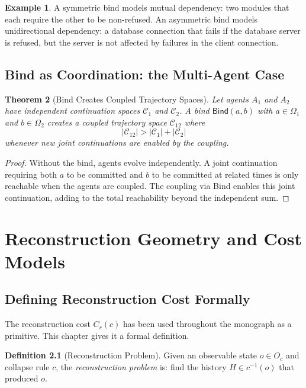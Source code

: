 \documentclass[12pt, a4paper, openany]{book}
\theoremstyle{plain}
\newtheorem{theorem}{Theorem}[chapter]
\theoremstyle{definition}
\newtheorem{definition}[theorem]{Definition}
\newtheorem{example}[theorem]{Example}
\theoremstyle{remark}
\newcommand{\Bind}{\mathsf{Bind}}
\newcommand{\calC}{\mathcal{C}}
\begin{document}
\begin{example}
A symmetric bind models mutual dependency: two modules that each require the
other to be non-refused. An asymmetric bind models unidirectional dependency:
a database connection that fails if the database server is refused, but the
server is not affected by failures in the client connection.
\end{example}

\section{Bind as Coordination: the Multi-Agent Case}

\begin{theorem}[Bind Creates Coupled Trajectory Spaces]
Let agents $A_1$ and $A_2$ have independent continuation spaces $\calC_1$ and
$\calC_2$. A bind $\Bind(a, b)$ with $a \in \Omega_1$ and $b \in \Omega_2$
creates a coupled trajectory space $\calC_{12}$ where
\[
|\calC_{12}| > |\calC_1| + |\calC_2|
\]
whenever new joint continuations are enabled by the coupling.
\end{theorem}

\begin{proof}
Without the bind, agents evolve independently. A joint continuation requiring
both $a$ to be committed and $b$ to be committed at related times is only
reachable when the agents are coupled. The coupling via Bind enables this
joint continuation, adding to the total reachability beyond the independent sum.
\end{proof}

\chapter{Reconstruction Geometry and Cost Models}

\section{Defining Reconstruction Cost Formally}

The reconstruction cost $C_r(c)$ has been used throughout the monograph as
a primitive. This chapter gives it a formal definition.

\begin{definition}[Reconstruction Problem]
Given an observable state $o \in O_c$ and collapse rule $c$, the
\emph{reconstruction problem} is: find the history $H \in c^{-1}(o)$ that
produced $o$.
\end{definition}
\end{document}
